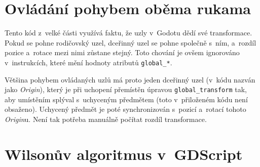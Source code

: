 \documentclass[12pt]{report}
\begin{document}
\chapter{Ovládání pohybem oběma rukama}\label{apx_gripped_object_transformation}
Tento kód z~velké části využívá faktu, že uzly v~Godotu dědí své transformace. Pokud se pohne rodičovský uzel, dceřinný uzel se pohne společně s~ním, a~rozdíl pozice a~rotace mezi nimi zůstane stejný. Toto chování je ovšem ignorováno v~instrukcích, které mění hodnoty atributů \texttt{global\_*}.

Většina pohybem ovládaných uzlů má proto jeden dceřinný uzel (v~kódu nazván jako \textit{Origin}), který je při uchopení přemístěn úpravou \texttt{global\_transform} tak, aby umístěním splýval s~uchyceným předmětem (toto v~přiloženém kódu není obsaženo). Uchycený předmět je poté synchronizován s~pozicí a~rotací tohoto \textit{Origin}u. Není tak potřeba manuálně počítat rozdíl transformace.



\chapter{Wilsonův algoritmus v~GDScript}\label{apx_mazegen}

\end{document}
